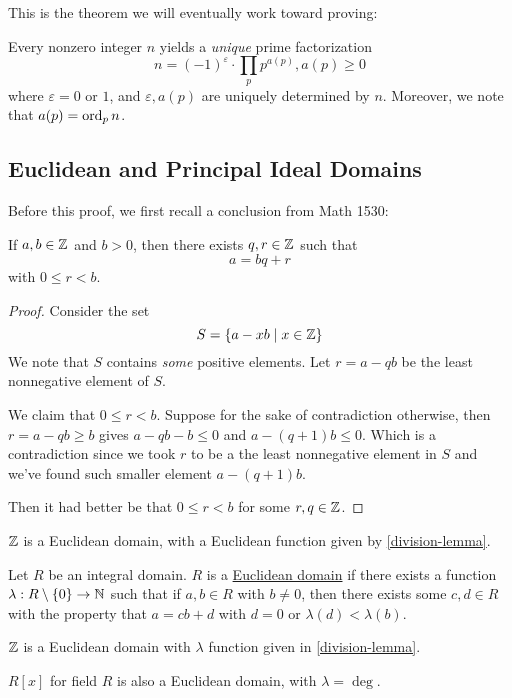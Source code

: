 This is the theorem we will eventually work toward proving:

\begin{theorem}\label{unique-factorization}
    Every nonzero integer $n$ yields a \emph{unique} prime factorization
    \begin{equation*}
        n = (-1)^\varepsilon\cdot \prod_{p}p^{a(p)}, a(p)\geq 0
    \end{equation*}
    where $\varepsilon = 0$ or $1$, and $\varepsilon, a(p)$ are uniquely determined by $n$. Moreover, we note that $a(p) = \operatorname{ord}_p n$.
\end{theorem}

\subsection{Euclidean and Principal Ideal Domains}
Before this proof, we first recall a conclusion from Math 1530:
\begin{lemma}\label{division-lemma}
    If $a, b\in \mathbb Z$ and $b>0$, then there exists $q, r\in \mathbb Z$ such that
    \[a = bq + r\]
    with $0\leq r < b$.
\end{lemma}
\begin{proof}
    Consider the set
    \[S = \{a - xb \mid x\in \mathbb Z\}\]
    We note that $S$ contains \emph{some} positive elements. Let $r = a - qb$ be the least nonnegative element of $S$.

    We claim that $0\leq r < b$. Suppose for the sake of contradiction otherwise, then $r = a - qb \geq b$ gives $a - qb - b \leq 0$ and $a - (q+1)b\leq 0$. Which is a contradiction since we took $r$ to be a the least nonnegative element in $S$ and we've found such smaller element $a - (q+1)b$.

    Then it had better be that $0\leq r < b$ for some $r, q\in\mathbb Z$.
\end{proof}
\begin{corollary}
    $\mathbb Z$ is a Euclidean domain, with a Euclidean function given by \cref{division-lemma}.
\end{corollary}

\begin{definition}
    Let $R$ be an integral domain. $R$ is a \ul{Euclidean domain} if there exists a function $\lambda: R\setminus \{0\} \to \mathbb N$ such that if $a, b\in R$ with $b\neq 0$, then there exists some $c, d\in R$ with the property that $a = cb + d$ with $d=0$ or $\lambda(d) < \lambda(b)$.
\end{definition}
\begin{example}
    $\mathbb Z$ is a Euclidean domain with $\lambda$ function given in \cref{division-lemma}.

    $R[x]$ for field $R$ is also a Euclidean domain, with $\lambda = \deg$.

\end{example}

